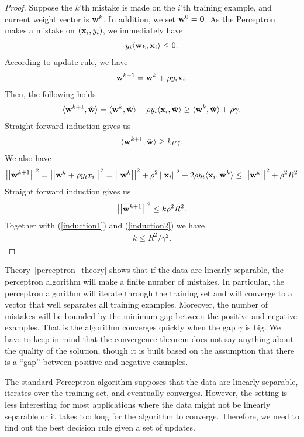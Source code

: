 {\begin{proof}
	Suppose the $k$'th mistake is made on the $i$'th training example, and current weight vector is $\mathbf {w}^k$.
	In addition, we set $\mathbf {w}^0=\mathbf {0}$.
	As the Perceptron makes a mistake on $(\mathbf {x}_i,y_i)$, we immediately have
	\begin{align*}
		y_i\langle \mathbf {w}_k, \mathbf {x}_i \rangle \le 0.
	\end{align*}
	According to update rule, we have
	\begin{align*}
		\mathbf {w}^{k+1} = \mathbf {w}^{k} + \rho y_i\mathbf {x}_i.
	\end{align*}
	Then, the following holds
	\begin{align*}
		\langle \mathbf {w}^{k+1}, \hat{\mathbf {w}} \rangle = \langle \mathbf {w}^k, \hat{\mathbf {w}} \rangle + \rho y_i\langle \mathbf {x}_i, \hat{\mathbf {w}} \rangle \ge \langle \mathbf {w}^k, \hat{\mathbf {w}} \rangle + \rho\gamma.
	\end{align*}
	Straight forward induction gives us
	\begin{align}
		\langle \mathbf {w}^{k+1}, \hat{\mathbf {w}} \rangle\ge k\rho\gamma. \label{induction1}
	\end{align}
	We also have
	\begin{align*}
		\left|\left| \mathbf {w}^{k+1} \right|\right|^2 
		= \left|\left| \mathbf {w}^{k} + \rho y_ix_i \right|\right|^2
		= \left|\left| \mathbf {w}^k \right|\right|^2 + \rho^2\left|\left| \mathbf {x}_i \right|\right|^2 + 2\rho y_i\langle \mathbf {x}_i, \mathbf {w}^k \rangle
		\le \left|\left| \mathbf {w}^k \right|\right|^2 + \rho^2R^2
	\end{align*}
	Straight forward induction gives us
	\begin{align}
		\left|\left| \mathbf {w}^{k+1} \right|\right|^2\le k\rho^2R^2. \label{induction2}
	\end{align}
	Together with (\ref{induction1}) and (\ref{induction2}) we have
	\begin{align*}
		k\le{R^2}/{\gamma^2}.
	\end{align*}
\end{proof}
Theory~\ref{perceptron_theory} shows that if the data are linearly separable, the perceptron algorithm will make a finite number of mistakes. 
In particular, the perceptron algorithm will iterate through the training set and will converge to a vector that well separates all training examples.
Moreover, the number of mistakes will be bounded by the minimum gap between the positive and negative examples.
That is the algorithm converges quickly when the gap $\gamma$ is big.
We have to keep in mind that the convergence theorem does not say anything about the quality of the solution, though it is built based on the assumption that there is a ``gap'' between positive and negative examples.

The standard Perceptron algorithm supposes that the data are linearly separable, iterates over the training set, and eventually converges.
However, the setting is less interesting for most applications where the data might not be linearly separable or it takes too long for the algorithm to converge.
Therefore, we need to find out the best decision rule given a set of updates.

}
